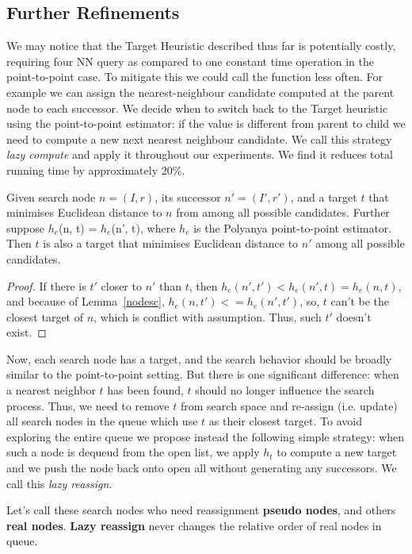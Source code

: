 \subsection{Further Refinements}
We may notice that the Target Heuristic described thus far is potentially costly, requiring 
four NN query as compared to one constant time operation in the point-to-point case.
To mitigate this we could call the function less often. 
For example we can assign the nearest-neighbour candidate computed at the parent node to each successor.
We decide when to switch back to the Target heuristic using the point-to-point estimator:
if the value is different from parent to child we need to compute a new next nearest neighbour candidate.
We call this strategy \textit{lazy compute} and apply it throughout our experiments.
We find it reduces total running time by approximately 20\%.

\begin{lemma}\label{lazy-compute}
  Given search node $n=(I,r)$, its successor $n'=(I', r')$,
  and a target $t$ that minimises Euclidean distance to $n$ from among all possible candidates.
  Further suppose $h_e$(n, t) = $h_e$(n', t), where $h_e$ is the Polyanya point-to-point estimator.
  Then $t$ is also a target that minimises Euclidean distance to $n'$ among all possible candidates.
\end{lemma}

\begin{proof}
  If there is $t'$ closer to $n'$ than $t$, then $h_e(n', t') <
  h_e(n', t) = h_e(n, t)$, and because of Lemma~\ref{nodesc},
  $h_e(n, t') <= h_e(n', t')$, so,
  $t$ can't be the closest target of $n$, which is conflict with assumption. Thus, such $t'$
  doesn't exist.
\end{proof}

Now, each search node has a target, and the search behavior should be broadly similar to 
the point-to-point setting.  But there is one significant difference:
when a nearest neighbor $t$ has been found, $t$ should no longer influence the search process.
Thus, we need to remove $t$ from search space and re-assign (i.e. update)
all search nodes in the queue which use $t$ as their closest target. 
To avoid exploring the entire queue we propose instead the following simple strategy: 
when such a node is dequeud from the open list, we apply $h_t$ to compute a new target
and we push the node back onto open all without generating any successors. 
We call this \textit{lazy reassign}.

\begin{lemma}\label{lazy-reassign}
  Let's call these search nodes who need reassignment \textbf{pseudo nodes}, and others
  \textbf{real nodes}. \textbf{Lazy reassign} never changes the relative order of real
  nodes in queue.
\end{lemma}

